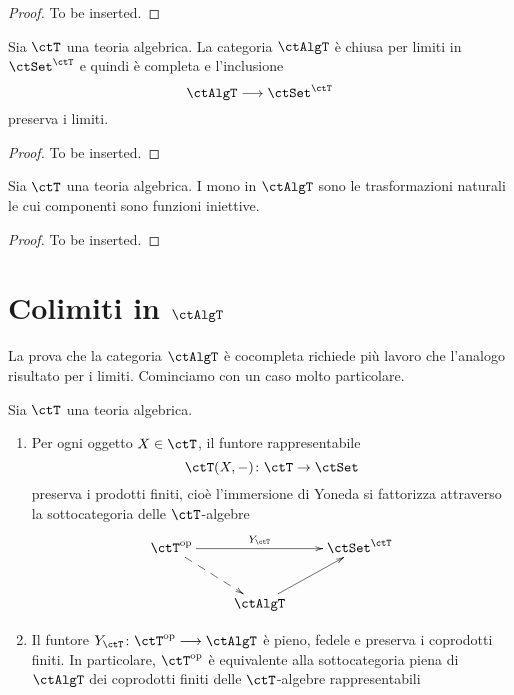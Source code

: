 \begin{proof}
	To be inserted.
\end{proof}

\begin{proposition}\label{prop_lim_AlgT}
	Sia \(\ctT\) una teoria algebrica. La categoria \(\ctAlgT\) è chiusa per limiti in \(\ctSet^{\ctT}\) e quindi è completa e l'inclusione
	\[
		\ctAlgT \fun \ctSet^{\ctT}
	\]
	preserva i limiti.
\end{proposition}

\begin{proof}
	To be inserted.
\end{proof}

\begin{corollary}\label{cor_mono_AlgT}
	Sia \(\ctT\) una teoria algebrica. I mono in \(\ctAlgT\) sono le trasformazioni naturali le cui componenti sono funzioni iniettive.
\end{corollary}

\begin{proof}
	To be inserted.
\end{proof}

\section{Colimiti in \(\ctAlgT\)}\label{sec_colim_AlgT}

La prova che la categoria \(\ctAlgT\) è cocompleta richiede più lavoro che l'analogo risultato per i limiti. Cominciamo con un caso
molto particolare.

\begin{proposition}\label{prop_Yoneda_alg}
	Sia \(\ctT\) una teoria algebrica.
	\begin{enumerate}
		\item Per ogni oggetto \(X \in \ctT\), il funtore rappresentabile
		      \[
			      \ctT(X,-) \colon \ctT \to \ctSet
		      \]
		      preserva i prodotti finiti, cioè l'immersione di Yoneda si fattorizza attraverso la sottocategoria delle \(\ctT\)-algebre
		      \[\xymatrix{\ctT^{\mathrm{op}} \ar[rr]^-{Y_{\ctT}} \ar@{-->}[rd] & & \ctSet^{\ctT} \\
			      & \ctAlgT \ar[ru] }\]
		\item Il funtore \(Y_{\ctT} \colon \ctT^{\mathrm{op}} \fun \ctAlgT\) è pieno, fedele e preserva i coprodotti finiti. In particolare,
		      \(\ctT^{\mathrm{op}}\) è equivalente alla sottocategoria piena di \(\ctAlgT\) dei coprodotti finiti delle \(\ctT\)-algebre rappresentabili
	\end{enumerate}
\end{proposition}


